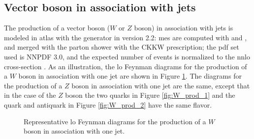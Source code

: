 \subsection{Vector boson in association with jets}

The production of a vector boson ($W$ or $Z$ boson) in association with jets is modeled in \gls{atlas} with the \Sherpa generator in version 2.2: \glspl{me} are 
computed with \comix \cite{Gleisberg:2008fv} and \OL \cite{Cascioli:2011va}, and merged with the \Sherpa parton shower with the CKKW prescription; the \gls{pdf} set used is NNPDF 3.0, and the expected number of events is normalized to the \gls{nnlo} cross-section \cite{Catani:2009sm}.
As an illustration, the \gls{lo} Feynman diagrams for the production of a $W$ boson in association with one jet are shown in Figure \ref{fig:W_prod}. 
The diagrams for the production of a $Z$ boson in association with one jet are the same, except that in the case of the $Z$ boson the 
two quarks in Figure \ref{fig:W_prod_1} and the quark and antiquark in Figure \ref{fig:W_prod_2} have the same flavor. 

\begin{figure}[h]
\centering 
{}
\caption{Representative \gls{lo} Feynman diagrams for the production of a $W$ boson in association with one jet.}\label{fig:W_prod}
\end{figure}

